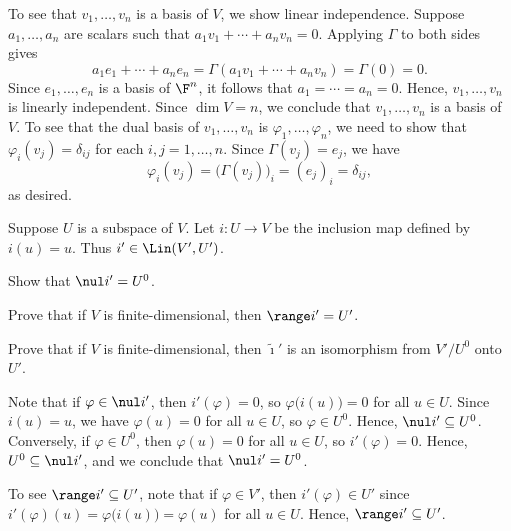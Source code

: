 \begin{exc}
\begin{solution}
To see that $v_1,\dots,v_n$ is a basis of $V$, we show linear independence.
Suppose $a_1,\dots,a_n$ are scalars such that $a_1v_1+\cdots+a_nv_n=0$.
Applying $\Gamma$ to both sides gives
\[ a_1e_1+\cdots+a_ne_n = \Gamma(a_1v_1+\cdots+a_nv_n) = \Gamma(0) = 0. \]
Since $e_1,\dots,e_n$ is a basis of $\F^n$, it follows that
$a_1=\cdots=a_n=0$. Hence, $v_1,\dots,v_n$ is linearly independent. Since
$\dim V=n$, we conclude that $v_1,\dots,v_n$ is a basis of $V$. To see that the
dual basis of $v_1,\dots,v_n$ is $\varphi_1,\dots,\varphi_n$, we need to show
that $\varphi_i(v_j)=\delta_{ij}$ for each $i,j=1,\dots,n$. Since
$\Gamma(v_j)=e_j$, we have
\[ \varphi_i(v_j) = \bigl(\Gamma(v_j)\bigr)_i = (e_j)_i = \delta_{ij}, \]
as desired.
\end{solution}

\begin{exercise}
Suppose $U$ is a subspace of $V$. Let $i\colon U\to V$ be the inclusion map
defined by $i(u)=u$. Thus $i'\in\Lin(V',U')$.
\begin{parts}
\item Show that $\nul i'=U^0$.
\item Prove that if $V$ is finite-dimensional, then $\range i'=U'$.
\item Prove that if $V$ is finite-dimensional, then $\tilde{\imath}'$ is an
  isomorphism from $V'/U^0$ onto $U'$.
\end{parts}
\end{exercise}
\begin{solution}\leavevmode
\begin{parts}
\item Note that if $\varphi\in\nul i'$, then $i'(\varphi)=0$, so
  $\varphi\bigl(i(u)\bigr)=0$ for all $u\in U$. Since $i(u)=u$, we have
  $\varphi(u)=0$ for all $u\in U$, so $\varphi\in U^0$. Hence,
  $\nul i'\subseteq U^0$. Conversely, if $\varphi\in U^0$, then $\varphi(u)=0$
  for all $u\in U$, so $i'(\varphi)=0$. Hence, $U^0\subseteq\nul i'$, and we
  conclude that $\nul i'=U^0$.
\item To see $\range i'\subseteq U'$, note that if $\varphi\in V'$, then
  $i'(\varphi)\in U'$ since $i'(\varphi)(u)=\varphi\bigl(i(u)\bigr)=\varphi(u)$
  for all $u\in U$. Hence, $\range i'\subseteq U'$.


\end{parts}
\end{solution}
\end{exc}
